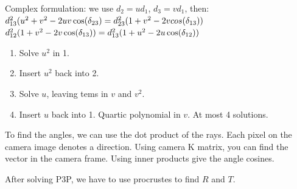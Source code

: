 Complex formulation: we use $d_2 = u d_1$, $d_3 = v d_1$, then:\\
$d_{13}^2 (u^2 + v^2 - 2 u v \cos(\delta_{23}) \\= 
d_{23}^2(1+v^2 - 2 v cos(\delta_{13}))$\\
$d_{12}^2 (1 + v^2 - 2v \cos(\delta_{13})) \\=
d_{13}^2 (1 + u^2 - 2u \cos(\delta_{12}))$
\begin{enumerate}
  \item Solve $u^2$ in 1.
  \item Insert $u^2$ back into 2.
  \item Solve $u$, leaving tems in $v$ and $v^2$.
  \item Insert $u$ back into 1. Quartic polynomial in $v$.
    \alert{At most 4 solutions}.
\end{enumerate}

\alert{To find the angles, we can use the dot product of the rays.}
Each pixel on the camera image denotes a direction. Using camera K matrix, you can find the vector in the camera frame. Using inner products give the angle cosines.

After solving P3P, we have to use procrustes to find $R$ and $T$.
